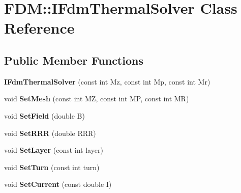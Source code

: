 \hypertarget{class_f_d_m_1_1_i_fdm_thermal_solver}{}\section{F\+D\+M\+:\+:I\+Fdm\+Thermal\+Solver Class Reference}
\label{class_f_d_m_1_1_i_fdm_thermal_solver}
\subsection*{Public Member Functions}
\begin{DoxyCompactItemize}
\item 
\hypertarget{class_f_d_m_1_1_i_fdm_thermal_solver_a19799db3d43b2a9c53505ec0c16e5128}{}{\bfseries I\+Fdm\+Thermal\+Solver} (const int Mz, const int Mp, const int Mr)\label{class_f_d_m_1_1_i_fdm_thermal_solver_a19799db3d43b2a9c53505ec0c16e5128}

\item 
\hypertarget{class_f_d_m_1_1_i_fdm_thermal_solver_a614b11bcbb0fe9b4902f717def1d29a4}{}void {\bfseries Set\+Mesh} (const int M\+Z, const int M\+P, const int M\+R)\label{class_f_d_m_1_1_i_fdm_thermal_solver_a614b11bcbb0fe9b4902f717def1d29a4}

\item 
\hypertarget{class_f_d_m_1_1_i_fdm_thermal_solver_a2bd55fc1b6880a3a78719daab05a8037}{}void {\bfseries Set\+Field} (double B)\label{class_f_d_m_1_1_i_fdm_thermal_solver_a2bd55fc1b6880a3a78719daab05a8037}

\item 
\hypertarget{class_f_d_m_1_1_i_fdm_thermal_solver_a13727d76c2d0b5f7a48f1d019761c528}{}void {\bfseries Set\+R\+R\+R} (double R\+R\+R)\label{class_f_d_m_1_1_i_fdm_thermal_solver_a13727d76c2d0b5f7a48f1d019761c528}

\item 
\hypertarget{class_f_d_m_1_1_i_fdm_thermal_solver_a6e6b85fb40d5581582d3daac5c608bb7}{}void {\bfseries Set\+Layer} (const int layer)\label{class_f_d_m_1_1_i_fdm_thermal_solver_a6e6b85fb40d5581582d3daac5c608bb7}

\item 
\hypertarget{class_f_d_m_1_1_i_fdm_thermal_solver_a123231ee7805f00899029112d0bb02a9}{}void {\bfseries Set\+Turn} (const int turn)\label{class_f_d_m_1_1_i_fdm_thermal_solver_a123231ee7805f00899029112d0bb02a9}

\item 
\hypertarget{class_f_d_m_1_1_i_fdm_thermal_solver_abbc66e0e1b39e1874a669f3939e4897a}{}void {\bfseries Set\+Current} (const double I)\label{class_f_d_m_1_1_i_fdm_thermal_solver_abbc66e0e1b39e1874a669f3939e4897a}


\end{DoxyCompactItemize}
